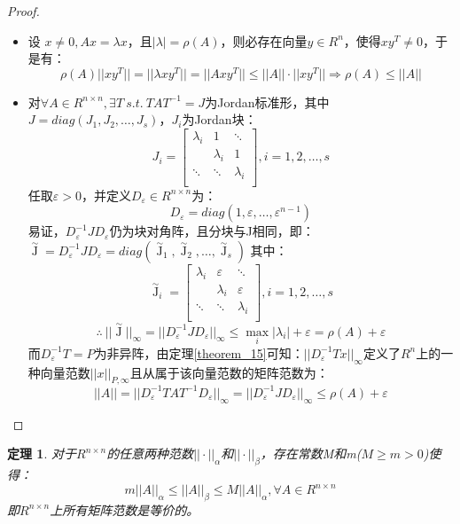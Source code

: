 \documentclass[a4paper]{article}
\newtheorem{theorem}{定理}[section]
\begin{document}
\begin{proof}
\begin{itemize}
\item 设 $x \neq 0, Ax=\lambda x$，且$|\lambda| = \rho (A)$，则必存在向量$y\in R^n$，使得$xy^T\neq 0$，于是有：
$$\rho(A)||xy^T|| = ||\lambda xy^T|| = ||Axy^T|| \le ||A||\cdot ||xy^T|| \Rightarrow \rho(A) \le ||A||$$
\item 对$\forall A \in R^{n\times n}, \exists T \ s.t. \ TAT^{-1}=J$为Jordan标准形，其中$J=diag(J_1, J_2, \dots, J_s)$，$J_i$为Jordan块：
$$J_i = \left[
\begin{matrix}
\lambda_i &  1 & \ddots\\
~ & \lambda_i & 1  \\
\ddots & \ddots & \lambda_i \\
\end{matrix}
\right], i=1, 2, \dots, s
$$
任取$\varepsilon > 0$，并定义$D_\varepsilon \in R^{n\times n}$为：
$$D_\varepsilon = diag(1, \varepsilon, \dots,\varepsilon^{n-1})$$
易证，$D^{-1}_{\varepsilon}JD_{\varepsilon}$仍为块对角阵，且分块与J相同，即：$ \mathop J\limits^{\sim}=D^{-1}_\varepsilon J D_\varepsilon = diag({\mathop J\limits^{\sim}}_1, {\mathop J\limits^{\sim}}_2, \dots, {\mathop J\limits^{\sim}}_s)$
其中：\\
$${\mathop J\limits^{\sim}}_i = \left[
\begin{matrix}
\lambda_i &  \varepsilon & \ddots\\
~ & \lambda_i & \varepsilon \\
\ddots & \ddots & \lambda_i \\
\end{matrix}
\right], i=1, 2, \dots, s
$$
$$\therefore \  ||{\mathop J\limits^{\sim}}||_\infty = ||D^{-1}_\varepsilon JD_\varepsilon||_\infty \le \max_i |\lambda_i|+\varepsilon = \rho(A)+\varepsilon$$
而$D^{-1}_\varepsilon T=P$为非异阵，由定理\ref{theorem_15}可知：$||D_\varepsilon^{-1}Tx||_\infty$定义了$R^n$上的一种向量范数$||x||_{P, \infty}$且从属于该向量范数的矩阵范数为：
$$||A||=||D^{-1}_\varepsilon TAT^{-1}D_\varepsilon ||_\infty=||D^{-1}_\varepsilon J D_\varepsilon||_\infty \le \rho(A) + \varepsilon$$
\end{itemize}
\end{proof}

\begin{theorem}
对于$R^{n\times n}$的任意两种范数$||\cdot||_\alpha$和$||\cdot||_\beta$，存在常数M和m($M\ge m > 0$)使得：
$$m||A||_\alpha \le ||A||_\beta \le M||A||_\alpha, \forall A \in R^{n\times n}$$
即$R^{n\times n}$上所有矩阵范数是等价的。
\end{theorem}
\end{document}
